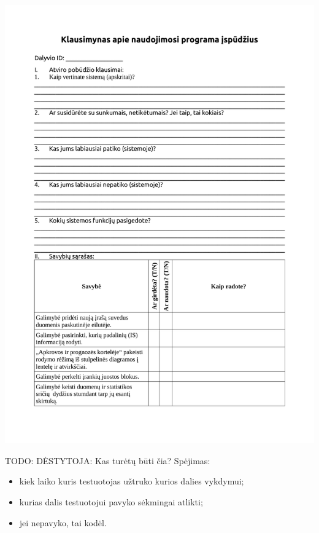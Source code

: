 \newpage
\noindent\includegraphics[scale=0.85, page=3]{./4/pdfs/klausimynas1.pdf}

\newpage
{}

TODO: DĖSTYTOJA: Kas turėtų būti čia? Spėjimas:
\begin{itemize}
  \item kiek laiko kuris testuotojas užtruko kurios dalies vykdymui;
  \item kurias dalis testuotojui pavyko sėkmingai atlikti;
  \item jei nepavyko, tai kodėl.
\end{itemize}
